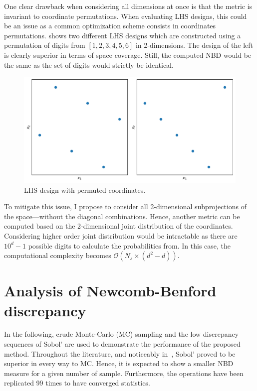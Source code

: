 \documentclass[1p]{elsarticle}
\begin{document}
One clear drawback when considering all dimensions at once is that the metric is invariant to coordinate permutations. When evaluating LHS designs, this could be an issue as a common optimization scheme consists in coordinates permutations.  shows two different LHS designs which are constructed using a permutation of digits from $[1, 2, 3, 4, 5, 6]$ in 2-dimensions. The design of the left is clearly superior in terms of space coverage. Still, the computed NBD would be the same as the set of digits would strictly be identical.


\begin{figure}[!h]               
\centering

\includegraphics[width=0.7\linewidth,height=\textheight,keepaspectratio]{fig/lhs.pdf}

\caption{LHS design with permuted coordinates.}
\label{fig:lhs}
\end{figure}


To mitigate this issue, I propose to consider all 2-dimensional subprojections of the space---without the diagonal combinations. Hence, another metric can be computed based on the 2-dimensional joint distribution of the coordinates. Considering higher order joint distribution would be intractable as there are $10^d-1$ possible digits to calculate the probabilities from. In this case, the computational complexity becomes $\mathcal{O}(N_s\times (d^2-d))$.


\section{Analysis of Newcomb-Benford discrepancy} \label{sec:results}

In the following, crude Monte-Carlo (MC) sampling and the low discrepancy sequences of Sobol' are used to demonstrate the performance of the proposed method. Throughout the literature, and noticeably in~\citep{Kucherenko2015}, Sobol' proved to be superior in every way to MC. Hence, it is expected to show a smaller NBD measure for a given number of sample. Furthermore, the operations have been replicated 99 times to have converged statistics.
\end{document}
